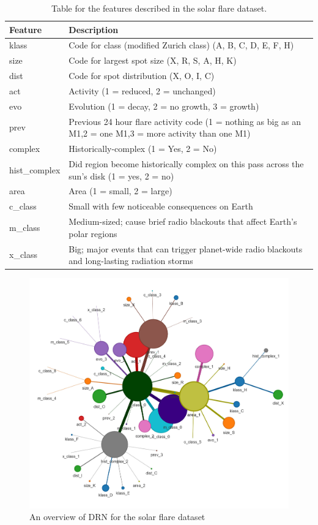 \begin{table}
    \begin{tabular}{l|l}
        \hline
        \textbf{Feature} & \textbf{Description} \\
        \hline
        klass & Code for class (modified Zurich class) (A, B, C, D, E, F, H) \\
        size & Code for largest spot size (X, R, S, A, H, K) \\
        dist & Code for spot distribution (X, O, I, C) \\
        act & Activity (1 = reduced, 2 = unchanged) \\
        evo & Evolution (1 = decay, 2 = no growth, 3 = growth) \\
        prev & Previous 24 hour flare activity code (1 = nothing as big as an M1,2 = one M1,3 = more activity than one M1) \\
        complex & Historically-complex (1 = Yes, 2 = No) \\
        hist\_complex & Did region become historically complex on this pass across the sun's disk (1 = yes, 2 = no) \\
        area & Area (1 = small, 2 = large) \\
        c\_class & Small with few noticeable consequences on Earth \\
        m\_class & Medium-sized; cause brief radio blackouts that affect Earth's polar regions \\
        x\_class & Big; major events that can trigger planet-wide radio blackouts and long-lasting radiation storms \\
        \hline
    \end{tabular}
    \caption{Table for the features described in the solar flare dataset.}
    \label{data_features}
\end{table}

\begin{figure}[]
    \noindent
    \includegraphics[width=\columnwidth]{solar_flares.jpg}
    \caption{An overview of DRN for the solar flare dataset}
    \label{solar}
\end{figure}

